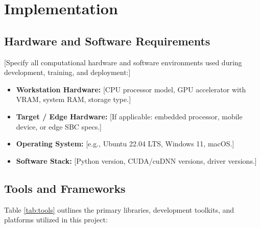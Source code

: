 \chapter{Implementation}

\section{Hardware and Software Requirements}
[Specify all computational hardware and software environments used during development, training, and deployment:]
\begin{itemize}
    \item \textbf{Workstation Hardware:} [CPU processor model, GPU accelerator with VRAM, system RAM, storage type.]
    \item \textbf{Target / Edge Hardware:} [If applicable: embedded processor, mobile device, or edge SBC specs.]
    \item \textbf{Operating System:} [e.g., Ubuntu 22.04 LTS, Windows 11, macOS.]
    \item \textbf{Software Stack:} [Python version, CUDA/cuDNN versions, driver versions.]
\end{itemize}

\section{Tools and Frameworks}
Table \ref{tab:tools} outlines the primary libraries, development toolkits, and platforms utilized in this project:

\begin{table}[htbp]
\centering
\caption{Software frameworks and toolkits utilized in the implementation}
\label{tab:tools}
\vspace{0.2cm}
\end{table}

